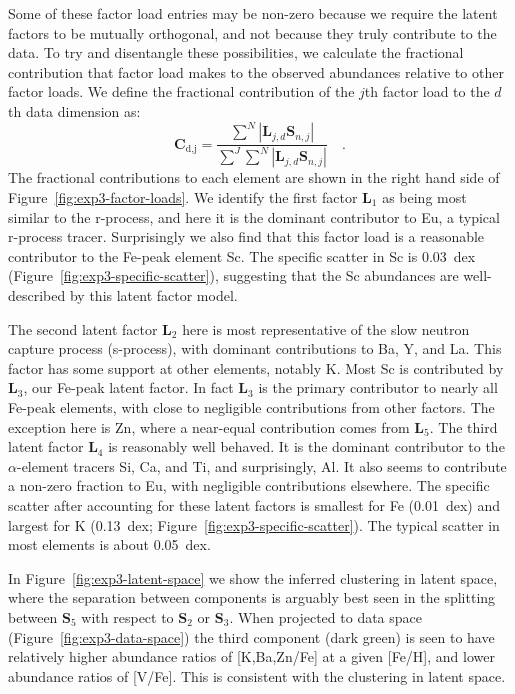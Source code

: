 \documentclass[twocolumn]{aastex62}
\newcommand{\factorloads}{\textbf{L}}
\newcommand{\factorscores}{\textbf{S}}
\begin{document}
Some of these factor load entries may be non-zero because we require the latent factors to
be mutually orthogonal, and not because they truly contribute to the data. To try and
disentangle these possibilities, we calculate the fractional contribution that factor
load makes to the observed abundances relative to other factor loads. We define the
fractional contribution of the $j$th factor load to the $d$th
data dimension as:
\begin{equation}
	\mathbf{C}_\textrm{d,j} = \frac{\sum^{N}|\factorloads_{j,d}\factorscores_{n,j}|}{\sum^J\sum^{N}|\factorloads_{j,d}\factorscores_{n,j}|} \quad .
\end{equation}
The fractional contributions to each element are shown in the right hand side of
Figure~\ref{fig:exp3-factor-loads}. We identify the first factor $\mathbf{L}_1$ 
as being most similar to the r-process, and here it is the dominant contributor to Eu, a typical r-process tracer. Surprisingly we also find that this factor load is a reasonable  contributor to the Fe-peak element Sc. The specific scatter in Sc is 0.03~dex (Figure~\ref{fig:exp3-specific-scatter}), suggesting that the Sc abundances are well-described by this latent factor model.
 

The second latent factor $\mathbf{L}_2$ here is most representative of the slow neutron capture process (s-process), with dominant contributions to Ba, Y, and La. This factor has some support at other elements, notably K. Most Sc is contributed by $\mathbf{L}_3$, our Fe-peak latent factor. In fact $\mathbf{L}_3$ is the primary contributor to nearly all Fe-peak elements, with close to negligible contributions from other factors. The exception here is Zn, where a near-equal contribution comes from $\mathbf{L}_5$.
The third latent factor $\mathbf{L}_4$ is reasonably well behaved. It is the dominant contributor to the $\alpha$-element tracers Si, Ca, and Ti, and surprisingly, Al. It also seems to contribute a non-zero fraction to Eu, with negligible contributions elsewhere.
The specific scatter after accounting for these latent factors is smallest
for Fe (0.01~dex) and largest for K (0.13~dex; Figure~\ref{fig:exp3-specific-scatter}). The typical scatter in most elements is about 0.05~dex.

In Figure~\ref{fig:exp3-latent-space} we show the inferred clustering in latent space,
where the separation between components is arguably best seen in the splitting between $\factorscores_5$ with respect to $\factorscores_2$ or $\factorscores_3$. When projected to data space (Figure~\ref{fig:exp3-data-space}) the third component (dark green) is seen to have relatively higher abundance ratios of [K,Ba,Zn/Fe] at a given [Fe/H],
and lower abundance ratios of [V/Fe]. This is consistent with the clustering in latent space.
\end{document}
